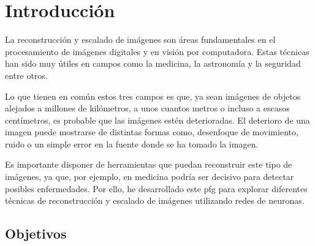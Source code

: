 \chapter{Introducción}
\label{ch:introduccion}

\quad La reconstrucción y escalado de imágenes son áreas fundamentales en el procesamiento de imágenes digitales y en visión por computadora. Estas técnicas han sido muy útiles en campos como la medicina, la astronomía y la seguridad  entre otros\cite{medicalrestore2,medicalrestore1,astronomyrestore1,securityrestore1}.

Lo que tienen en común estos tres campos es que, ya sean imágenes de objetos alejados a millones de kilómetros, a unos cuantos metros o incluso a escasos centímetros, es probable que las imágenes estén deterioradas. El deterioro de una imagen puede mostrarse de distintas formas como, desenfoque de movimiento, ruido o un simple error en la fuente donde se ha tomado la imagen\cite{OWLNet}.

Es importante disponer de herramientas que puedan reconstruir este tipo de imágenes, ya que, por ejemplo, en medicina podría ser decisivo para detectar posibles enfermedades. Por ello, he desarrollado este \gls{pfg} para explorar diferentes técnicas de reconstrucción y escalado de imágenes utilizando redes de neuronas.





\section{Objetivos}

